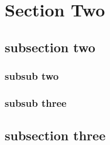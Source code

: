 \section{Section Two}
\subsection{subsection two}
\lipsum[3-4]
\subsubsection{subsub two}
\lipsum[5]
\subsubsection{subsub three}
\lipsum[6]
\subsection{subsection three}
\lipsum[7-8]
